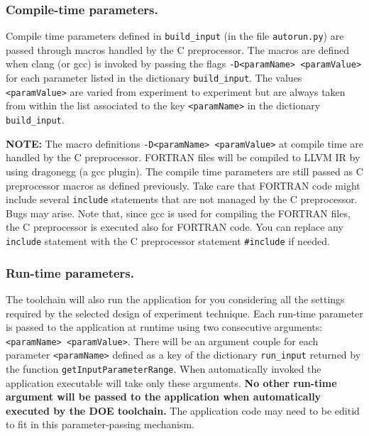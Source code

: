 \documentclass[a4paper, 10pt]{article}
\begin{document}
\subsubsection*{Compile-time parameters.}

Compile time parameters defined in \verb!build_input! (in the file \verb!autorun.py!)
are passed through macros handled by the C preprocessor. The macros are defined when clang (or gcc) is invoked by passing
the flags \verb!-D<paramName> <paramValue>! for each parameter listed in the dictionary \verb!build_input!.
The values \verb!<paramValue>! are varied from experiment to experiment but are always taken from within the list
associated to the key \verb!<paramName>! in the dictionary \verb!build_input!.

\textbf{NOTE:} The macro definitions \verb!-D<paramName> <paramValue>! at compile time are handled by the C preprocessor.
FORTRAN files will be compiled to LLVM IR by using dragonegg (a gcc plugin). The compile time parameters are still passed as C preprocessor macros
as defined previously.
Take care that FORTRAN code might include several \verb!include! statements that are not managed by the C preprocessor.
Bugs may arise. Note that, since gcc is used for compiling the FORTRAN files, the C preprocessor is executed also for FORTRAN code.
You can replace any \verb!include! statement
with the C preprocessor statement \verb!#include! if needed.

\subsubsection*{Run-time parameters.}

The toolchain will also run the application for you considering all the settings required by the selected design of experiment technique.
Each run-time parameter is passed to the application at runtime using two consecutive arguments: \verb!<paramName> <paramValue>!.
There will be an argument couple for each parameter \verb!<paramName>!
defined as a key of the dictionary \verb!run_input! returned by the function \verb!getInputParameterRange!.
When automatically invoked the application executable will take only these arguments.
\textbf{No other run-time argument will be passed to the application when automatically executed by the DOE toolchain.} The application code may
need to be editid to fit in this parameter-passing mechanism.
\end{document}

